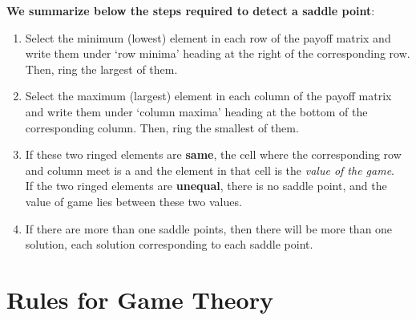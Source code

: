 \documentclass[../main-sheet.tex]{subfiles}
\begin{document}
\textbf{We summarize below the steps required to detect a saddle point}:
\begin{enumerate}[label=(\roman*)]
    \item Select the minimum (lowest) element in each row of the payoff matrix and write them under `row minima' heading at the right of the corresponding row. Then, ring the largest of them.
    \item Select the maximum (largest) element in each column of the payoff matrix and write them under `column maxima' heading at the bottom of the corresponding column. Then, ring the smallest of them.
    \item If these two ringed elements are \textbf{same}, the cell where the corresponding row and column meet is a  and the element in that cell is the \emph{value of the game}.\\
    If the two ringed elements are \textbf{unequal}, there is no saddle point, and the value of game lies between these two values.
    \item If there are more than one saddle points, then there will be more than one solution, each solution corresponding to each saddle point.
\end{enumerate}
\section{Rules for Game Theory}
\end{document}
